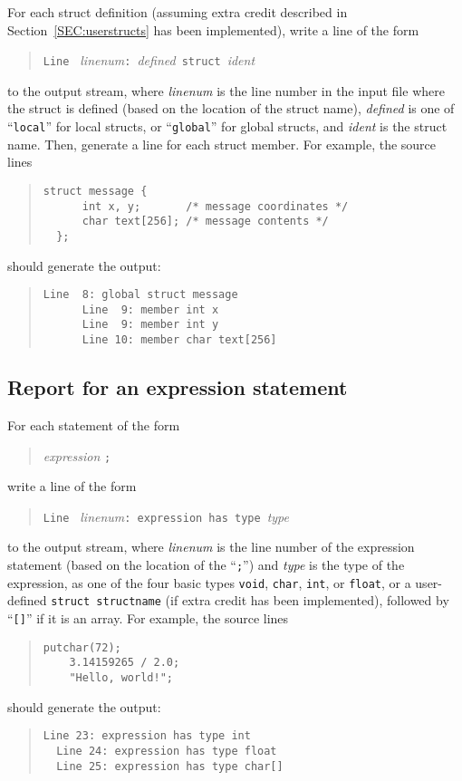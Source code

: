 \documentclass{article}
\begin{document}
For each struct definition
(assuming extra credit described in Section~\ref{SEC:userstructs}
has been implemented),
write a line of the form
\begin{quote}
  {\tt Line } \emph{linenum}{\tt :}~\emph{defined}~{\tt struct}~\emph{ident}
\end{quote}
to the output stream,
where \emph{linenum} is the line number in the input file where
the struct is defined
(based on the location of the struct name),
\emph{defined} is one of ``\verb|local|'' for local structs,
  or ``\verb|global|'' for global structs,
and \emph{ident} is the struct name.
Then, generate a line for each struct member.
For example, the source lines
\begin{quote}
\begin{lstlisting}[firstnumber=8]
  struct message {
      int x, y;       /* message coordinates */
      char text[256]; /* message contents */
  };
\end{lstlisting}
\end{quote}
should generate the output:
\begin{quote}
  \begin{lstlisting}[style=Output]
  Line  8: global struct message
      Line  9: member int x
      Line  9: member int y
      Line 10: member char text[256]
  \end{lstlisting}
\end{quote}

\subsection{Report for an expression statement}
\label{SEC:exprout}

For each statement of the form
\begin{quote}
  \emph{expression} {\tt ;}
\end{quote}
write a line of the form
\begin{quote}
  {\tt Line } \emph{linenum}{\tt : expression has type}~\emph{type}
\end{quote}
to the output stream,
where \emph{linenum} is the line number of the expression statement
(based on the location of the ``\verb|;|'')
and \emph{type} is the type of the expression,
as one of the four basic types
{\tt void}, {\tt char}, {\tt int}, or {\tt float},
or a user-defined {\tt struct structname}
(if extra credit has been implemented),
followed by ``\verb|[]|'' if it is an array.
For example, the source lines
\begin{quote}
\begin{lstlisting}[firstnumber=23]
    putchar(72);
    3.14159265 / 2.0;
    "Hello, world!";
\end{lstlisting}
\end{quote}
should generate the output:
\begin{quote}
  \begin{lstlisting}[style=Output]
  Line 23: expression has type int
  Line 24: expression has type float
  Line 25: expression has type char[]
  \end{lstlisting}
\end{quote}
\end{document}
